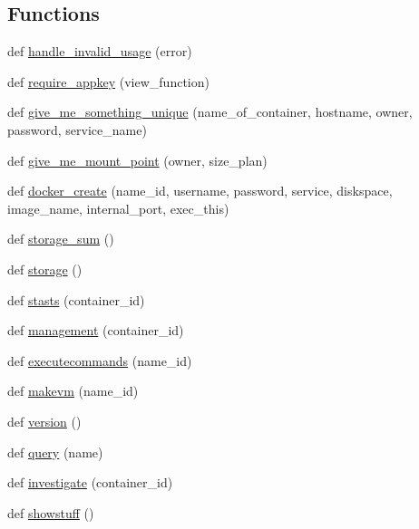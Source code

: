 \subsection*{Functions}
\begin{DoxyCompactItemize}
\item 
def \hyperlink{namespacedocker-proxy_1_1my__proxy_a0c927506d8346f17b620ac8e131174d0}{handle\+\_\+invalid\+\_\+usage} (error)
\item 
def \hyperlink{namespacedocker-proxy_1_1my__proxy_a219b29b5c79ad35297fb1f1deef275a3}{require\+\_\+appkey} (view\+\_\+function)
\item 
def \hyperlink{namespacedocker-proxy_1_1my__proxy_a0bf8985afda99ee825115bd5df0b6b40}{give\+\_\+me\+\_\+something\+\_\+unique} (name\+\_\+of\+\_\+container, hostname, owner, password, service\+\_\+name)
\item 
def \hyperlink{namespacedocker-proxy_1_1my__proxy_a32ea0c997fb4530822b84a6861f9666c}{give\+\_\+me\+\_\+mount\+\_\+point} (owner, size\+\_\+plan)
\item 
def \hyperlink{namespacedocker-proxy_1_1my__proxy_a7c16c9ad1dd493bd800fb0ccb04cfe32}{docker\+\_\+create} (name\+\_\+id, username, password, service, diskspace, image\+\_\+name, internal\+\_\+port, exec\+\_\+this)
\item 
def \hyperlink{namespacedocker-proxy_1_1my__proxy_a5c4e8ad5904fc41dc6e53312834445ae}{storage\+\_\+sum} ()
\item 
def \hyperlink{namespacedocker-proxy_1_1my__proxy_a2d2a47f5b69859690e7d948cbe5898a4}{storage} ()
\item 
def \hyperlink{namespacedocker-proxy_1_1my__proxy_ae108a533f8a3353f199f69883994c3cf}{stasts} (container\+\_\+id)
\item 
def \hyperlink{namespacedocker-proxy_1_1my__proxy_a96423469e4fe05cd336a8af7cb28d2ba}{management} (container\+\_\+id)
\item 
def \hyperlink{namespacedocker-proxy_1_1my__proxy_abf1a0936dc4dd14a5aaa78854c6583ce}{executecommands} (name\+\_\+id)
\item 
def \hyperlink{namespacedocker-proxy_1_1my__proxy_aaab4affe92f8974338caa10c0cf70c22}{makevm} (name\+\_\+id)
\item 
def \hyperlink{namespacedocker-proxy_1_1my__proxy_ad3276ec211f2fe107e03e4ed5e346df6}{version} ()
\item 
def \hyperlink{namespacedocker-proxy_1_1my__proxy_a7f6173c933a3e2e679eedb795386a08e}{query} (name)
\item 
def \hyperlink{namespacedocker-proxy_1_1my__proxy_a51d957f776d16e54de05b7034b113c1f}{investigate} (container\+\_\+id)
\item 
def \hyperlink{namespacedocker-proxy_1_1my__proxy_a84a1e1b9285c530fcd8b04177d08cdb3}{showstuff} ()
\end{DoxyCompactItemize}

